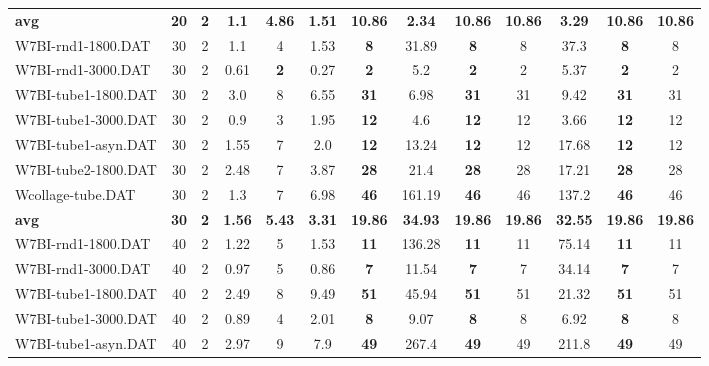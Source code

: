 \begin{table}[h]
{\begin{tabular}{lcccccccccccc}
\cline{1-13} \textbf{avg} & \textbf{20} & \textbf{2} & \textbf{1.1} & \textbf{4.86} & \textbf{1.51} & \textbf{10.86} & \textbf{2.34} & \textbf{10.86} & \textbf{10.86} & \textbf{3.29} & \textbf{10.86} & \textbf{10.86} \\ \cline{1-13}
W7BI-rnd1-1800.DAT & 30 & 2 &  \textcolor{blue2}{1.1} & 4 & 1.53 &  \textbf{8} & 31.89 &  \textbf{8} & 8 & 37.3 &  \textbf{8} & 8 \\
W7BI-rnd1-3000.DAT & 30 & 2 & 0.61 &  \textbf{2} &  \textcolor{blue2}{0.27} &  \textbf{2} & 5.2 &  \textbf{2} & 2 & 5.37 &  \textbf{2} & 2 \\
W7BI-tube1-1800.DAT & 30 & 2 &  \textcolor{blue2}{3.0} & 8 & 6.55 &  \textbf{31} & 6.98 &  \textbf{31} & 31 & 9.42 &  \textbf{31} & 31 \\
W7BI-tube1-3000.DAT & 30 & 2 &  \textcolor{blue2}{0.9} & 3 & 1.95 &  \textbf{12} & 4.6 &  \textbf{12} & 12 & 3.66 &  \textbf{12} & 12 \\
W7BI-tube1-asyn.DAT & 30 & 2 &  \textcolor{blue2}{1.55} & 7 & 2.0 &  \textbf{12} & 13.24 &  \textbf{12} & 12 & 17.68 &  \textbf{12} & 12 \\
W7BI-tube2-1800.DAT & 30 & 2 &  \textcolor{blue2}{2.48} & 7 & 3.87 &  \textbf{28} & 21.4 &  \textbf{28} & 28 & 17.21 &  \textbf{28} & 28 \\
Wcollage-tube.DAT & 30 & 2 &  \textcolor{blue2}{1.3} & 7 & 6.98 &  \textbf{46} & 161.19 &  \textbf{46} & 46 & 137.2 &  \textbf{46} & 46 \\
\cline{1-13} \textbf{avg} & \textbf{30} & \textbf{2} & \textbf{1.56} & \textbf{5.43} & \textbf{3.31} & \textbf{19.86} & \textbf{34.93} & \textbf{19.86} & \textbf{19.86} & \textbf{32.55} & \textbf{19.86} & \textbf{19.86} \\ \cline{1-13}
W7BI-rnd1-1800.DAT & 40 & 2 &  \textcolor{blue2}{1.22} & 5 & 1.53 &  \textbf{11} & 136.28 &  \textbf{11} & 11 & 75.14 &  \textbf{11} & 11 \\
W7BI-rnd1-3000.DAT & 40 & 2 & 0.97 & 5 &  \textcolor{blue2}{0.86} &  \textbf{7} & 11.54 &  \textbf{7} & 7 & 34.14 &  \textbf{7} & 7 \\
W7BI-tube1-1800.DAT & 40 & 2 &  \textcolor{blue2}{2.49} & 8 & 9.49 &  \textbf{51} & 45.94 &  \textbf{51} & 51 & 21.32 &  \textbf{51} & 51 \\
W7BI-tube1-3000.DAT & 40 & 2 &  \textcolor{blue2}{0.89} & 4 & 2.01 &  \textbf{8} & 9.07 &  \textbf{8} & 8 & 6.92 &  \textbf{8} & 8 \\
W7BI-tube1-asyn.DAT & 40 & 2 &  \textcolor{blue2}{2.97} & 9 & 7.9 &  \textbf{49} & 267.4 &  \textbf{49} & 49 & 211.8 &  \textbf{49} & 49 \\

\end{tabular}}
\end{table}
